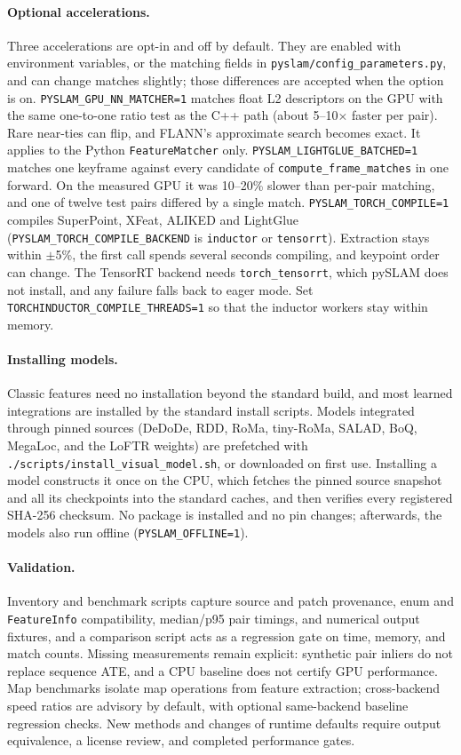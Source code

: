 \documentclass{article}
\let\oldparagraph\paragraph
\renewcommand{\paragraph}[1]{\oldparagraph{#1}\mbox{}}
\begin{document}
\paragraph{Optional accelerations.} Three accelerations are opt-in and off by default. They are enabled with environment variables, or the matching fields in \texttt{pyslam/config\_parameters.py}, and can change matches slightly; those differences are accepted when the option is on. \texttt{PYSLAM\_GPU\_NN\_MATCHER=1} matches float L2 descriptors on the GPU with the same one-to-one ratio test as the C++ path (about 5--10$\times$ faster per pair). Rare near-ties can flip, and FLANN's approximate search becomes exact. It applies to the Python \texttt{FeatureMatcher} only. \texttt{PYSLAM\_LIGHTGLUE\_BATCHED=1} matches one keyframe against every candidate of \texttt{compute\_frame\_matches} in one forward. On the measured GPU it was 10--20\% slower than per-pair matching, and one of twelve test pairs differed by a single match. \texttt{PYSLAM\_TORCH\_COMPILE=1} compiles SuperPoint, XFeat, ALIKED and LightGlue (\texttt{PYSLAM\_TORCH\_COMPILE\_BACKEND} is \texttt{inductor} or \texttt{tensorrt}). Extraction stays within $\pm$5\%, the first call spends several seconds compiling, and keypoint order can change. The TensorRT backend needs \texttt{torch\_tensorrt}, which pySLAM does not install, and any failure falls back to eager mode. Set \texttt{TORCHINDUCTOR\_COMPILE\_THREADS=1} so that the inductor workers stay within memory.

\paragraph{Installing models.} Classic features need no installation beyond the standard build, and most learned integrations are installed by the standard install scripts. Models integrated through pinned sources (DeDoDe, RDD, RoMa, tiny-RoMa, SALAD, BoQ, MegaLoc, and the LoFTR weights) are prefetched with \texttt{./scripts/install\_visual\_model.sh}, or downloaded on first use. Installing a model constructs it once on the CPU, which fetches the pinned source snapshot and all its checkpoints into the standard caches, and then verifies every registered SHA-256 checksum. No package is installed and no pin changes; afterwards, the models also run offline (\texttt{PYSLAM\_OFFLINE=1}).

\paragraph{Validation.} Inventory and benchmark scripts capture source and patch provenance, enum and \texttt{FeatureInfo} compatibility, median/p95 pair timings, and numerical output fixtures, and a comparison script acts as a regression gate on time, memory, and match counts. Missing measurements remain explicit: synthetic pair inliers do not replace sequence ATE, and a CPU baseline does not certify GPU performance. Map benchmarks isolate map operations from feature extraction; cross-backend speed ratios are advisory by default, with optional same-backend baseline regression checks. New methods and changes of runtime defaults require output equivalence, a license review, and completed performance gates.
\end{document}
